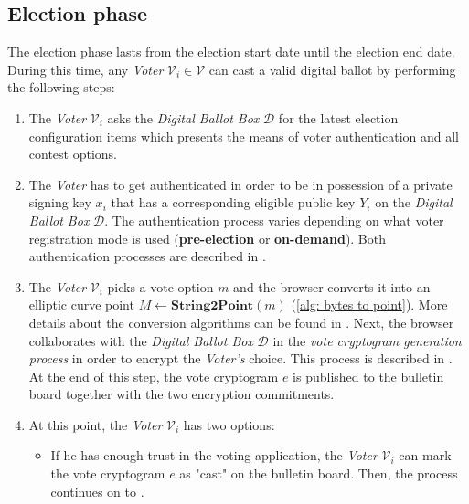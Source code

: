 \subsection{Election phase} \label{sec: election phase}

The election phase lasts from the election start date until the election end date. During this time, any \textit{Voter} $\mathcal{V}_i \in \boldsymbol{\mathcal{V}}$ can cast a valid digital ballot by performing the following steps:
\begin{enumerate}
    \item The \textit{Voter} $\mathcal{V}_i$ asks the \textit{Digital Ballot Box} $\mathcal{D}$ for the latest election configuration items which presents the means of voter authentication and all contest options.
    
    \item The \textit{Voter} has to get authenticated in order to be in possession of a private signing key $x_i$ that has a corresponding eligible public key $Y_i$ on the \textit{Digital Ballot Box} $\mathcal{D}$. The authentication process varies depending on what voter registration mode is used (\textbf{pre-election} or \textbf{on-demand}). Both authentication processes are described in .
 
    \item \label{itm: pick vote} The \textit{Voter} $\mathcal{V}_i$ picks a vote option $m$ and the browser converts it into an elliptic curve point \( M \leftarrow \mathbf{String2Point}(m) \) (\cref{alg: bytes to point}). More details about the conversion algorithms can be found in . Next, the browser collaborates with the \textit{Digital Ballot Box} $\mathcal{D}$ in the \textit{vote cryptogram generation process} in order to encrypt the \textit{Voter's} choice. This process is described in . At the end of this step, the vote cryptogram $e$ is published to the bulletin board together with the two encryption commitments.
    
    \item At this point, the \textit{Voter} $\mathcal{V}_i$ has two options:
    \begin{itemize}
        \item If he has enough trust in the voting application, the \textit{Voter} $\mathcal{V}_i$ can mark the vote cryptogram $e$ as "cast" on the bulletin board. Then, the process continues on to .
        

\end{itemize}
\end{enumerate}
